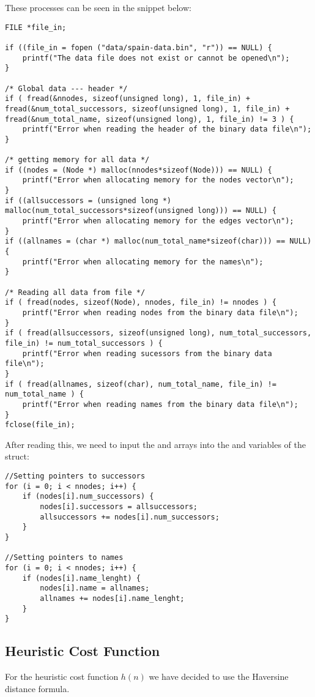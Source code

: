 These processes can be seen in the snippet below:
\begin{lstlisting}
FILE *file_in;

if ((file_in = fopen ("data/spain-data.bin", "r")) == NULL) {
	printf("The data file does not exist or cannot be opened\n");
}

/* Global data --- header */
if ( fread(&nnodes, sizeof(unsigned long), 1, file_in) +
fread(&num_total_successors, sizeof(unsigned long), 1, file_in) +
fread(&num_total_name, sizeof(unsigned long), 1, file_in) != 3 ) {
	printf("Error when reading the header of the binary data file\n");
}

/* getting memory for all data */
if ((nodes = (Node *) malloc(nnodes*sizeof(Node))) == NULL) {
	printf("Error when allocating memory for the nodes vector\n");
}
if ((allsuccessors = (unsigned long *) malloc(num_total_successors*sizeof(unsigned long))) == NULL) {
	printf("Error when allocating memory for the edges vector\n");
}
if ((allnames = (char *) malloc(num_total_name*sizeof(char))) == NULL) {
	printf("Error when allocating memory for the names\n");
}

/* Reading all data from file */
if ( fread(nodes, sizeof(Node), nnodes, file_in) != nnodes ) {
	printf("Error when reading nodes from the binary data file\n");
}
if ( fread(allsuccessors, sizeof(unsigned long), num_total_successors, file_in) != num_total_successors ) {
	printf("Error when reading sucessors from the binary data file\n");
}
if ( fread(allnames, sizeof(char), num_total_name, file_in) != num_total_name ) {
	printf("Error when reading names from the binary data file\n");
}
fclose(file_in);
\end{lstlisting}

After reading this, we need to input the  and  arrays into the  and  variables of the  struct:
\begin{lstlisting}
//Setting pointers to successors
for (i = 0; i < nnodes; i++) {
	if (nodes[i].num_successors) {
		nodes[i].successors = allsuccessors;
		allsuccessors += nodes[i].num_successors;
	}
}

//Setting pointers to names
for (i = 0; i < nnodes; i++) {
	if (nodes[i].name_lenght) {
		nodes[i].name = allnames;
		allnames += nodes[i].name_lenght;
	}
}
\end{lstlisting}

\subsection{Heuristic Cost Function}
For the heuristic cost function $h(n)$ we have decided to use the Haversine distance formula.

